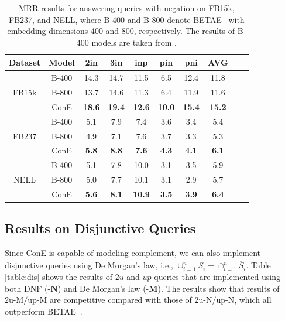 \documentclass{article}
\newcommand{\betae}{{\normalsize{B}\footnotesize{ETA}\normalsize{E}}}
\begin{document}
\vspace{5mm}
\begin{table}[ht]
    \centering
    \caption{MRR results for answering queries with negation on FB15k, FB237, and NELL, where B-400 and B-800 denote \betae~ with embedding dimensions 400 and 800, respectively. The results of B-400 models are taken from \citet{beta}.}
    \label{table:negation_results_800}
    \vspace{1mm}
    \begin{tabular}{ c c  c c c c  c c c c }
        \toprule
         \textbf{Dataset} & \textbf{Model} &\textbf{2in} &\textbf{3in} &\textbf{inp} &\textbf{pin} &\textbf{pni} &\textbf{AVG}\\
        \midrule
        \multirow{3}{*}{FB15k} 
        &B-400 &14.3 &14.7 &11.5 &6.5 &12.4 &11.8\\
        &B-800 &13.7 &14.6 &11.3 &6.4 &11.9 &11.6\\
        &ConE &\textbf{18.6} &\textbf{19.4} &\textbf{12.6} &\textbf{10.0} &\textbf{15.4} &\textbf{15.2}\\
        \midrule
        \multirow{3}{*}{FB237}
        &B-400 &5.1 &7.9 &7.4 &3.6 &3.4 &5.4\\
        &B-800 &4.9 &7.1 &7.6 &3.7 &3.3 &5.3\\
        &ConE &\textbf{5.8} &\textbf{8.8} &\textbf{7.6} &\textbf{4.3} &\textbf{4.1} &\textbf{6.1}\\
        \midrule
        \multirow{3}{*}{NELL} 
        &B-400 &5.1 &7.8 &10.0 &3.1 &3.5 &5.9\\
        &B-800 &5.0 &7.7 &10.1 &3.1 &2.9 &5.7\\
        &ConE &\textbf{5.6} &\textbf{8.1} &\textbf{10.9} &\textbf{3.5} &\textbf{3.9} &\textbf{6.4}\\
        \bottomrule
    \end{tabular}
    \vspace{-5mm}
\end{table}

\newpage
\subsection{Results on Disjunctive Queries}
Since ConE is capable of modeling complement, we can also implement disjunctive queries using De Morgan's law, i.e., $\cup_{i=1}^n S_i=\overline{\cap_{i=1}^n\overline{S}_i}$. Table \ref{table:dis} shows the results of $2u$ and $up$ queries that are implemented using both DNF ($\textbf{-N}$) and De Morgan's law ($\textbf{-M}$). The results show that  results of $\text{2u-M}/\text{up-M}$ are competitive compared with those of $\text{2u-N}/\text{up-N}$, which all outperform \betae~.
\end{document}
